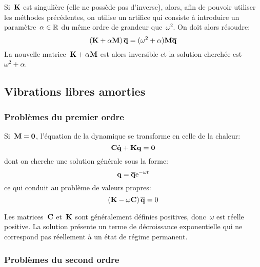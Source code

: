 Si~$\MM{K}$ est singulière (elle ne possède pas d'inverse), alors, afin de pouvoir utiliser les méthodes précédentes, on utilise un artifice qui consiste à introduire un paramètre~$\alpha\in\mathbb R$ du même ordre de grandeur que~$\omega^2$. On doit alors résoudre:
\begin{equation}\left(\MM{K}+\alpha \MM{M}\right)\VV{\overline{q}} = (\omega^2+\alpha)\MM{M} \VV{\overline{q}}\end{equation}
La nouvelle matrice~$\MM{K}+\alpha \MM{M}$ est alors inversible et la solution cherchée est~$\omega^2+\alpha$.

\medskip
\subsection{Vibrations libres amorties}

\subsubsection{Problèmes du premier ordre}

Si~$\MM{M}=\MM{0}$, l'équation de la dynamique se transforme en celle de la chaleur:
\begin{equation} \MM{C}\VV{\dot{q}}+\MM{K}\VV{q}=\VV{0} \end{equation}
dont on cherche une solution générale sous la forme:
\begin{equation} \VV{q}=\VV{\overline{q}}\mathrm{e}^{-\omega t} \end{equation}
ce qui conduit au problème de valeurs propres:
\begin{equation} \left(\MM{K}-\omega\MM{C}\right)\VV{\overline{q}}=0\end{equation}

Les matrices~$\MM{C}$ et~$\MM{K}$ sont généralement définies positives, donc~$\omega$ est réelle positive. La solution présente un terme de décroissance exponentielle qui ne correspond pas réellement à un état de régime permanent.

\medskip
\subsubsection{Problèmes du second ordre}

